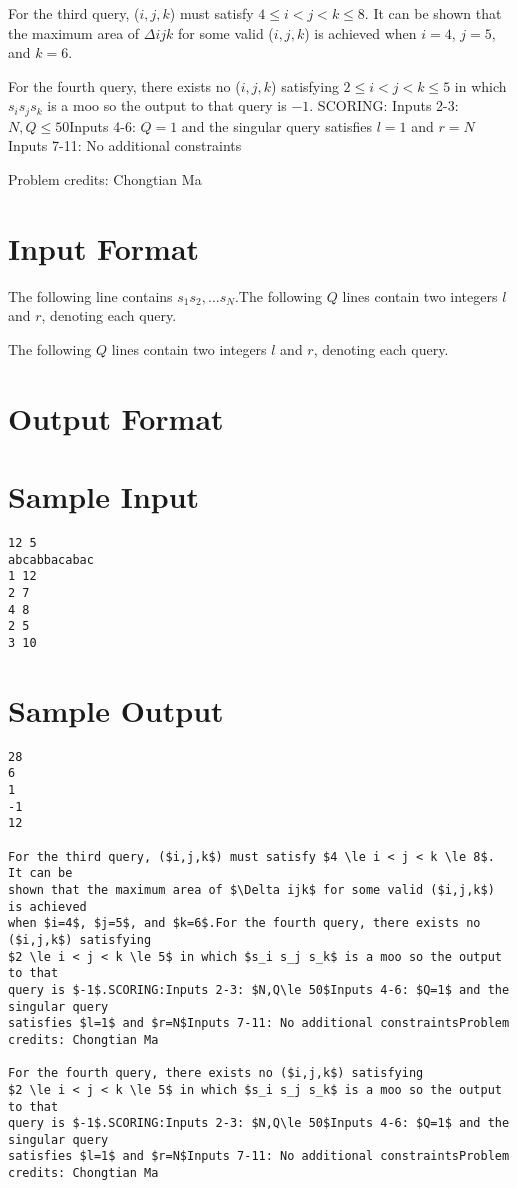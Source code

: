 \documentclass[12pt]{article}
\begin{document}
For the third query, ($i,j,k$) must satisfy $4 \le i < j < k \le 8$. It can be
shown that the maximum area of $\Delta ijk$ for some valid ($i,j,k$) is achieved
when $i=4$, $j=5$, and $k=6$.

For the fourth query, there exists no ($i,j,k$) satisfying
$2 \le i < j < k \le 5$ in which $s_i s_j s_k$ is a moo so the output to that
query is $-1$.
SCORING:
Inputs 2-3: $N,Q\le 50$Inputs 4-6: $Q=1$ and the singular query
satisfies $l=1$ and $r=N$Inputs 7-11: No additional constraints


Problem credits: Chongtian Ma



\section*{Input Format}
The following line contains $s_1 s_2, \ldots s_N$.The following $Q$ lines contain two integers $l$ and $r$, denoting each query.

The following $Q$ lines contain two integers $l$ and $r$, denoting each query.

\section*{Output Format}


\section*{Sample Input}
\begin{verbatim}
12 5
abcabbacabac
1 12
2 7
4 8
2 5
3 10
\end{verbatim}

\section*{Sample Output}
\begin{verbatim}
28
6
1
-1
12

For the third query, ($i,j,k$) must satisfy $4 \le i < j < k \le 8$. It can be
shown that the maximum area of $\Delta ijk$ for some valid ($i,j,k$) is achieved
when $i=4$, $j=5$, and $k=6$.For the fourth query, there exists no ($i,j,k$) satisfying
$2 \le i < j < k \le 5$ in which $s_i s_j s_k$ is a moo so the output to that
query is $-1$.SCORING:Inputs 2-3: $N,Q\le 50$Inputs 4-6: $Q=1$ and the singular query
satisfies $l=1$ and $r=N$Inputs 7-11: No additional constraintsProblem credits: Chongtian Ma

For the fourth query, there exists no ($i,j,k$) satisfying
$2 \le i < j < k \le 5$ in which $s_i s_j s_k$ is a moo so the output to that
query is $-1$.SCORING:Inputs 2-3: $N,Q\le 50$Inputs 4-6: $Q=1$ and the singular query
satisfies $l=1$ and $r=N$Inputs 7-11: No additional constraintsProblem credits: Chongtian Ma
\end{verbatim}
\end{document}
